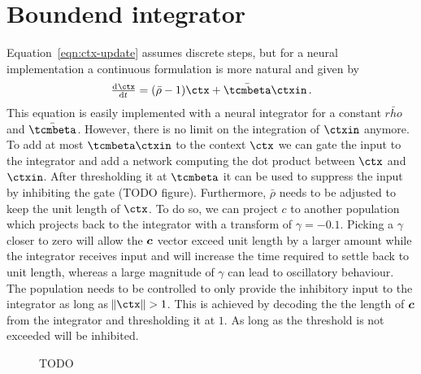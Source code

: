 \section{Boundend integrator}
Equation~\ref{eqn:ctx-update} assumes discrete steps, but for a neural implementation a continuous formulation is more natural and given by
\begin{equation}
    \od{\ctx}{t} = (\bar{\rho} - 1) \ctx + \bar{\tcmbeta} \ctxin\,\text{.}
\end{equation}
This equation is easily implemented with a neural integrator for a constant $\bar{rho}$ and $\bar{\tcmbeta}$.
However, there is no limit on the integration of $\ctxin$ anymore.
To add at most $\tcmbeta \ctxin$ to the context $\ctx$ we can gate the input to the integrator and add a network computing the dot product between $\ctx$ and $\ctxin$.
After thresholding it at $\tcmbeta$ it can be used to suppress the input by inhibiting the gate (TODO figure).
Furthermore, $\bar{\rho}$ needs to be adjusted to keep the unit length of $\ctx$.
To do so, we can project $c$ to another population  which projects back to the integrator with a transform of $\gamma = -0.1$.
Picking a $\gamma$ closer to zero will allow the $\bm{c}$ vector exceed unit length by a larger amount while the integrator receives input and will increase the time required to settle back to unit length, whereas a large magnitude of $\gamma$ can lead to oscillatory behaviour.
The  population needs to be controlled to only provide the inhibitory input to the integrator as long as $\norm{\ctx} > 1$.
This is achieved by decoding the the length of $\bm{c}$ from the integrator and thresholding it at $1$.
As long as the threshold is not exceeded  will be inhibited.
\begin{figure}
    \caption{TODO}
\end{figure}

